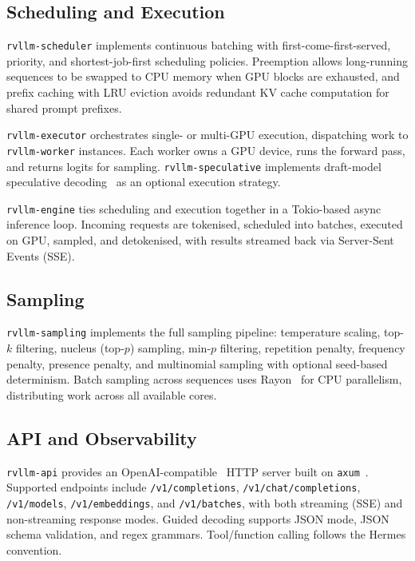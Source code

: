 \documentclass[11pt,a4paper]{article}
\begin{document}
\subsection{Scheduling and Execution}

\texttt{rvllm-scheduler} implements continuous batching with first-come-first-served,
priority, and shortest-job-first scheduling policies. Preemption allows long-running
sequences to be swapped to CPU memory when GPU blocks are exhausted, and prefix caching
with LRU eviction avoids redundant KV cache computation for shared prompt prefixes.

\texttt{rvllm-executor} orchestrates single- or multi-GPU execution, dispatching work
to \texttt{rvllm-worker} instances. Each worker owns a GPU device, runs the forward
pass, and returns logits for sampling. \texttt{rvllm-speculative} implements draft-model
speculative decoding~\cite{leviathan2023speculative} as an optional execution strategy.

\texttt{rvllm-engine} ties scheduling and execution together in a Tokio-based async
inference loop. Incoming requests are tokenised, scheduled into batches, executed on
GPU, sampled, and detokenised, with results streamed back via Server-Sent Events (SSE).

\subsection{Sampling}

\texttt{rvllm-sampling} implements the full sampling pipeline: temperature scaling,
top-$k$ filtering, nucleus (top-$p$) sampling, min-$p$ filtering, repetition penalty,
frequency penalty, presence penalty, and multinomial sampling with optional seed-based
determinism. Batch sampling across sequences uses Rayon~\cite{rayon2023} for CPU
parallelism, distributing work across all available cores.

\subsection{API and Observability}

\texttt{rvllm-api} provides an OpenAI-compatible~\cite{openai2023api} HTTP server
built on \texttt{axum}~\cite{axum2023}. Supported endpoints include
\texttt{/v1/completions}, \texttt{/v1/chat/completions}, \texttt{/v1/models},
\texttt{/v1/embeddings}, and \texttt{/v1/batches}, with both streaming (SSE) and
non-streaming response modes. Guided decoding supports JSON mode, JSON schema
validation, and regex grammars. Tool/function calling follows the Hermes convention.
\end{document}
